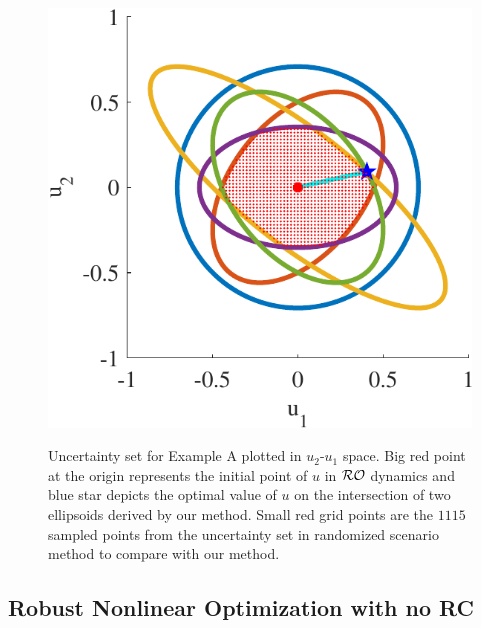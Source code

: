 \documentclass[journal,twoside,web]{ieeecolor}
\newcommand{\rev}[1]{\textcolor{revisionblue}{#1}}
\begin{document}
\begin{figure}
\begin{center}
\includegraphics[scale=0.55]{ellipsoids}
\vspace{-1.5mm}
\caption{\rev{Uncertainty set for Example A plotted in $u_
2$-$u_1$ space. Big red point at the origin represents the initial point of $u$ in ${\cal RO}$ dynamics and blue star depicts the optimal value of $u$ on the intersection of two ellipsoids derived by our method. Small red grid points are the $1115$ sampled points from the uncertainty set in randomized scenario method \cite{calafiore2004} to compare with our method.}}
\vspace{-8mm}
\label{ellipsoids}
\end{center}
\end{figure}

\subsection{Robust Nonlinear Optimization with no RC}\label{norc.sec}
\end{document}
